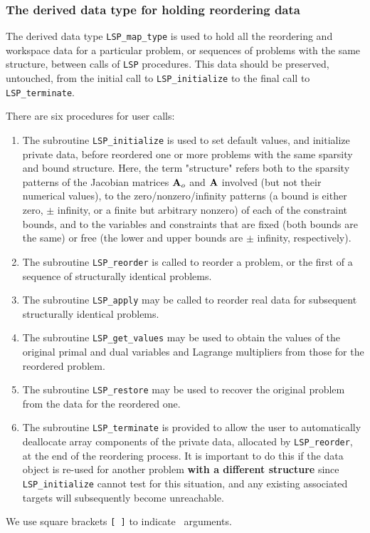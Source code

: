 \documentclass{galahad}
\newcommand{\packagename}{LSP}
\begin{document}

\subsubsection{The derived data type for holding reordering data}\label{typemap}
The derived data type
{\tt \packagename\_map\_type}
is used to hold all the reordering and workspace data for a particular
problem, or sequences of problems with the same structure, between calls of
{\tt \packagename} procedures.
This data should be preserved, untouched, from the initial call to
{\tt \packagename\_initialize}
to the final call to
{\tt \packagename\_terminate}.


\galarguments
There are six procedures for user calls:

\begin{enumerate}
\item The subroutine
  {\tt \packagename\_initialize}
  is used to set default
  values, and initialize private data, before reordered one or more problems
  with the same sparsity and bound structure.
  Here, the term "structure" refers both to
  the sparsity patterns of the Jacobian matrices ${\mathbf{A}}_o$  and ${\mathbf{A}}$
  involved
  (but not their numerical values), to the zero/nonzero/infinity patterns
  (a bound is either zero, $\pm$ infinity, or a finite but arbitrary
  nonzero) of each of the constraint bounds, and to the variables and
  constraints that are fixed (both bounds are the same) or free
  (the lower and upper bounds are $\pm$ infinity, respectively).

\item The subroutine
  {\tt \packagename\_reorder}
  is called to reorder a problem, or the first of a sequence of structurally
  identical problems.

\item The subroutine
  {\tt \packagename\_apply}
  may be called to reorder real data for subsequent structurally identical
  problems.

\item The subroutine
  {\tt \packagename\_get\_values}
  may be used to obtain the values of the original primal and dual variables
  and Lagrange multipliers from those for the reordered problem.

\item The subroutine {\tt \packagename\_restore} may be used to recover the
  original problem from the data for the reordered one.

\item The subroutine
  {\tt \packagename\_terminate}
  is provided to allow the user to automatically deallocate array components
  of the private data,  allocated by
  {\tt \packagename\_reorder},
  at the end of the reordering process. It is important to do this if the data
  object is re-used for another problem {\bf with a different structure}
  since {\tt \packagename\_initialize} cannot test for this situation,
  and any existing associated targets will subsequently become unreachable.
\end{enumerate}
We use square brackets {\tt [ ]} to indicate \optional\ arguments.
\end{document}
